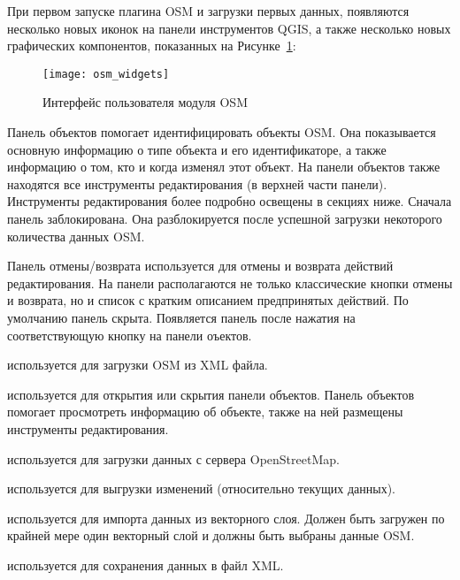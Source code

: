 При первом запуске плагина OSM и загрузки первых данных, появляются
несколько новых иконок на панели инструментов QGIS, а также несколько
новых графических компонентов, показанных на Рисунке~\ref{fig:osmwidget}:

\begin{figure}[ht]
   \centering
   \texttt{[image: osm\_widgets]}
   \caption{Интерфейс пользователя модуля OSM \wincaption}\label{fig:osmwidget}
\end{figure}


Панель объектов помогает идентифицировать объекты OSM. Она показывается
основную информацию о типе объекта и его идентификаторе, а также
информацию о том, кто и когда изменял этот объект. На панели объектов
также находятся все инструменты редактирования (в верхней части панели).
Инструменты редактирования более подробно освещены в секциях ниже.
Сначала панель заблокирована. Она разблокируется после успешной загрузки
некоторого количества данных OSM.


Панель отмены/возврата используется для отмены и возврата действий
редактирования. На панели располагаются не только классические кнопки
отмены и возврата, но и список с кратким описанием предпринятых действий.
По умолчанию панель скрыта. Появляется панель после нажатия на
соответствующую кнопку на панели оъектов.


\begin{description}
\item {} используется для
загрузки OSM из XML файла.
\item {}
используется для открытия или скрытия панели объектов. Панель объектов
помогает просмотреть информацию об объекте, также на ней размещены
инструменты редактирования.
\item {}
используется для загрузки данных с сервера OpenStreetMap.
\item {} используется для
выгрузки изменений (относительно текущих данных).
\item {}
используется для импорта данных из векторного слоя. Должен быть загружен
по крайней мере один векторный слой и должны быть выбраны данные OSM.
\item {} используется для
сохранения данных в файл XML.
\end{description}


